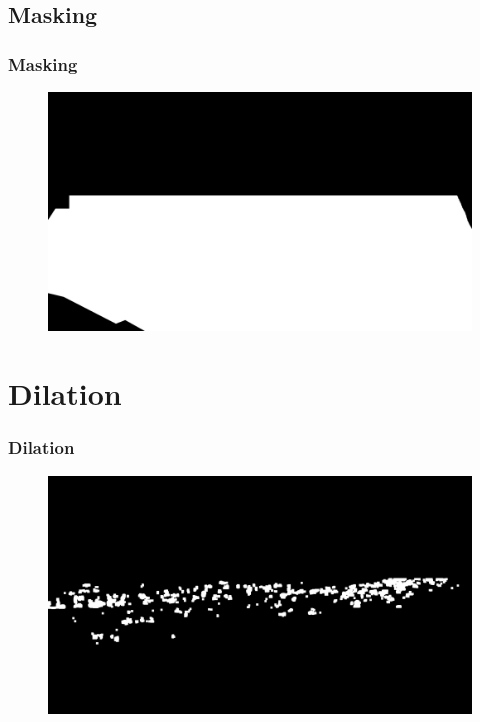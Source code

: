\documentclass{beamer}
\begin{document}
\subsection*{Masking}
\begin{frame}
    \frametitle{Masking}
    \begin{figure}
        \centering
        \includegraphics[width=\textwidth]{../mask.png}
    \end{figure}
\end{frame}

\section{Dilation}
\begin{frame}
    \frametitle{Dilation}

    \begin{figure}
        \centering
        \includegraphics[width=\textwidth]{../gen/dil/1660305600.jpg}
    \end{figure}

    
\end{frame}
\end{document}
